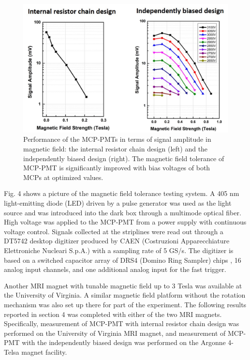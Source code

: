\documentclass[preprint,5p]{elsarticle}
\begin{document}
\begin{figure}[tbp]
\centering \includegraphics[scale=0.7]{fig/Figure5.jpg}
\caption{Performance of the MCP-PMTs in terms of signal amplitude in magnetic 
   field: the internal resistor chain design (left) and the independently 
   biased design (right). The magnetic field tolerance of MCP-PMT is 
   significantly improved with bias voltages of both MCPs at optimized values.  
   } \label{fig:design}
\end{figure}



Fig. 4 shows a picture of the magnetic field tolerance testing system. A 405 nm 
light-emitting diode (LED) driven by a pulse generator was used as the light 
source and was introduced into the dark box through a multimode optical 
fiber. High voltage was applied to the MCP-PMT from a power supply with 
continuous voltage control. Signals collected at the striplines were read out 
through a DT5742 desktop digitizer \cite{19} produced by CAEN (Costruzioni 
Apparecchiature Elettroniche Nucleari S.p.A.) with a sampling rate of 5 GS/s.  
The digitizer is based on a switched capacitor array of DRS4 (Domino Ring 
Sampler) chips \cite{20}, 16 analog input channels, and one additional analog 
input for the fast trigger. 

Another MRI magnet with tunable magnetic field up to 3 Tesla was available at 
the University of Virginia. A similar magnetic field platform without the 
rotation mechanism was also set up there for part of the experiment. The 
following results reported in section 4 was completed with either of the two 
MRI magnets. Specifically, measurement of MCP-PMT with internal resistor chain 
design was performed on the University of Virginia MRI magnet, and measurement 
of MCP-PMT with the independently biased design was performed on the Argonne 
4-Telsa magnet facility. 
\end{document}
